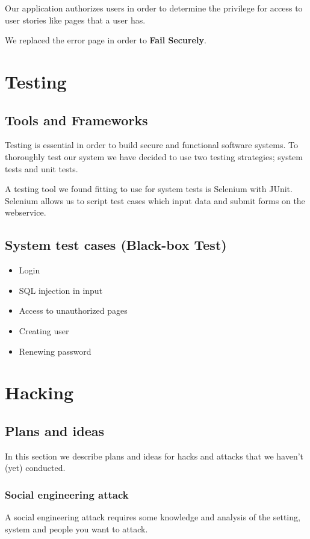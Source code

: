 \documentclass[a4paper]{article}
\begin{document}
Our application authorizes users in order to determine the privilege for access to user stories like pages that a user has.

We replaced the error page in order to \textbf{Fail Securely}.


\section{Testing}
\subsection{Tools and Frameworks}
Testing is essential in order to build secure and functional software systems. To thoroughly test our system we have decided to use two testing strategies; system tests and unit tests.

A testing tool we found fitting to use for system tests is Selenium with JUnit. Selenium allows us to script test cases which input data and submit forms on the webservice.

\subsection{System test cases (Black-box Test)}

\begin{itemize}
\item Login
\item SQL injection in input
\item Access to unauthorized pages
\item Creating user
\item Renewing password
\end{itemize}


\section{Hacking}
\subsection{Plans and ideas}
In this section we describe plans and ideas for hacks and attacks that we haven't (yet) conducted.
\subsubsection{Social engineering attack}
A social engineering attack requires some knowledge and analysis of the setting, system and people you want to attack.
\end{document}
